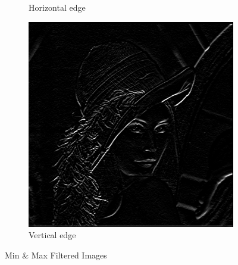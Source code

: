\documentclass[a4paper,16pt]{article}
\begin{document}
\begin{figure}[h!]
\begin{subfigure}[h!]{0.45\linewidth}
			\caption{Horizontal edge}
		\end{subfigure}
		\hfill
		\centering
		\begin{subfigure}[h!]{0.45\linewidth}
			\includegraphics[width=\linewidth]{vertical}
			\caption{Vertical edge}
		\end{subfigure}%
		\caption{Min \& Max Filtered Images}
	\end{figure}
	\newpage
	
\end{document}
